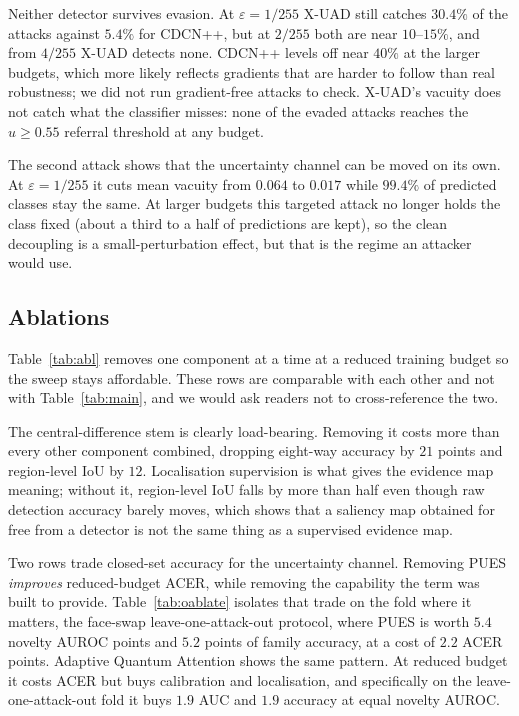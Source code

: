 \documentclass[conference]{IEEEtran}
\begin{document}
Neither detector survives evasion. At $\varepsilon=1/255$ X-UAD still catches
$30.4\%$ of the attacks against $5.4\%$ for CDCN++, but at $2/255$ both are near
$10$--$15\%$, and from $4/255$ X-UAD detects none. CDCN++ levels off near $40\%$ at
the larger budgets, which more likely reflects gradients that are harder to follow
than real robustness; we did not run gradient-free attacks to check. X-UAD's
vacuity does not catch what the classifier misses: none of the evaded attacks
reaches the $u\ge0.55$ referral threshold at any budget.

The second attack shows that the uncertainty channel can be moved on its own. At
$\varepsilon=1/255$ it cuts mean vacuity from $0.064$ to $0.017$ while $99.4\%$ of
predicted classes stay the same. At larger budgets this targeted attack no longer
holds the class fixed (about a third to a half of predictions are kept), so the
clean decoupling is a small-perturbation effect, but that is the regime an attacker
would use.

\subsection{Ablations}\label{sec:abl}
Table~\ref{tab:abl} removes one component at a time at a reduced training budget so
the sweep stays affordable. These rows are comparable with each other and not with
Table~\ref{tab:main}, and we would ask readers not to cross-reference the two.

\begin{table}[t]
\centering
\caption{Component ablation at a reduced training budget. Deltas are relative to the
full model in the first row. These rows are comparable with each other but not
directly with Table~\ref{tab:main}.}
\label{tab:abl}
\small

\end{table}

The central-difference stem is clearly load-bearing. Removing it costs more than
every other component combined, dropping eight-way accuracy by $21$ points and
region-level IoU by $12$. Localisation supervision is what gives the
evidence map meaning; without it, region-level IoU falls by more than half even
though raw detection accuracy barely moves, which shows
that a saliency map obtained for free from a detector is not the same thing as
a supervised evidence map.

Two rows trade closed-set accuracy for
the uncertainty channel. Removing PUES \emph{improves} reduced-budget ACER,
while removing the capability the term was built to provide.
Table~\ref{tab:oablate} isolates that trade on the fold where it matters,
the face-swap leave-one-attack-out protocol, where PUES is worth $5.4$ novelty AUROC
points and $5.2$ points of family accuracy, at a cost of $2.2$ ACER points. Adaptive
Quantum Attention shows the same pattern. At reduced budget it costs ACER but buys
calibration and localisation, and specifically on the leave-one-attack-out fold it
buys $1.9$ AUC and $1.9$ accuracy at equal novelty AUROC.
\end{document}
